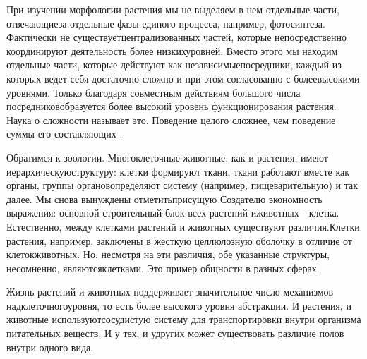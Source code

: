 \documentclass[10pt]{article}
\begin{document}
При изучении морфологии растения мы не выделяем в нем отдельные части, отвечающие\linebreak за отдельные фазы единого процесса, например, фотосинтеза. Фактически не существует\linebreak централизованных частей, которые непосредственно координируют деятельность более низких\linebreak уровней. Вместо этого мы находим отдельные части, которые действуют как независимые\linebreak посредники, каждый из которых ведет себя достаточно сложно и при этом согласованно с более\linebreak высокими уровнями. Только благодаря совместным действиям большого числа посредников\linebreak образуется более высокий уровень функционирования растения. Наука о сложности называет это. Поведение целого сложнее, чем поведение суммы его составляющих \linebreak \cite{Waldrop}. \vspace{3mm}

Обратимся к зоологии. Многоклеточные животные, как и растения, имеют иерархическую\linebreak структуру: клетки формируют ткани, ткани работают вместе как органы, группы органов\linebreak определяют систему (например, пищеварительную) и так далее. Мы снова вынуждены отметить\linebreak присущую Создателю экономность выражения: основной строительный блок всех растений и\linebreak животных - клетка. Естественно, между клетками растений и животных существуют различия.\linebreak Клетки растения, например, заключены в жесткую целлюлозную оболочку в отличие от клеток\linebreak животных. Но, несмотря на эти различия, обе указанные структуры, несомненно, являются\linebreak клетками. Это пример общности в разных сферах. \vspace{3mm}

Жизнь растений и животных поддерживает значительное число механизмов надклеточного\linebreak уровня, то есть более высокого уровня абстракции. И растения, и животные используют\linebreak сосудистую систему для транспортировки внутри организма питательных веществ. И у тех, и у\linebreak других может существовать различие полов внутри одного вида.\vspace{1.5mm}
 
\end{document}
